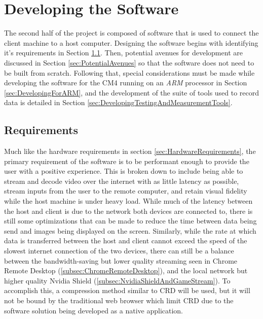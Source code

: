 \chapter{Developing the Software} %

\label{Chapter5} %

The second half of the project is composed of software that is used to connect the client machine to a host computer.
Designing the software begins with identifying it's requirements in Section \ref{sec:SoftwareRequirements}.
Then, potential avenues for development are discussed in Section \ref{sec:PotentialAvenues} so that the software does not need to be built from scratch.
Following that, special considerations must be made while developing the software for the CM4 running on an \emph{ARM} processor in Section \ref{sec:DevelopingForARM}, and the development of the suite of tools used to record data is detailed in Section \ref{sec:DevelopingTestingAndMeasurementTools}.


\section{Requirements}\label{sec:SoftwareRequirements}

Much like the hardware requirements in section \ref{sec:HardwareRequirements}, the primary requirement of the software is to be performant enough to provide the user with a positive experience.
This is broken down to include being able to stream and decode video over the internet with as little latency as possible, stream inputs from the user to the remote computer, and retain visual fidelity while the host machine is under heavy load.
While much of the latency between the host and client is due to the network both devices are connected to, there is still some optimizations that can be made to reduce the time between data being send and images being displayed on the screen.
Similarly, while the rate at which data is transferred between the host and client cannot exceed the speed of the slowest internet connection of the two devices, there can still be a balance between the bandwidth-saving but lower quality streaming seen in Chrome Remote Desktop (\ref{subsec:ChromeRemoteDesktop}), and the local network but higher quality Nvidia Shield (\ref{subsec:NvidiaShieldAndGameStream}).
To accomplish this, a compression method similar to CRD will be used, but it will not be bound by the traditional web browser which limit CRD due to the software solution being developed as a native application.

